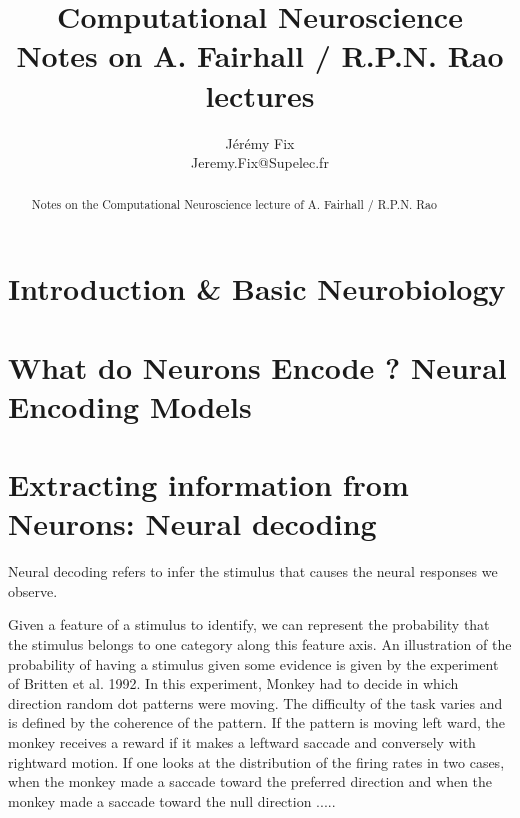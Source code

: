 \documentclass[10pt,a4paper]{article}
\title{Computational Neuroscience \\ 
		\large \vspace*{-10pt} Notes on A. Fairhall / R.P.N. Rao lectures\vspace*{10pt}}
\author{%
	Jérémy Fix \\
	Jeremy.Fix@Supelec.fr \\
	\vspace{20pt}
	}
\makeatletter
\def\printtitle{%
    {\color{bl} \centering \huge \sc \textbf{\@title}\par}}		%
\def\printauthor{%
    {\centering \small \@author}}				%
\makeatother
\begin{document}
\printtitle 

\printauthor

\begin{abstract}
Notes on the Computational Neuroscience lecture of A. Fairhall / R.P.N. Rao
\end{abstract}

\tableofcontents

\pagebreak

\section{Introduction \& Basic Neurobiology}

\section{What do Neurons Encode ? Neural Encoding Models}

\section{Extracting information from Neurons: Neural decoding}

Neural decoding refers to infer the stimulus that causes the neural
responses we observe.

Given a feature of a stimulus to identify, we can represent the
probability that the stimulus belongs to one category along this
feature axis. An illustration of the probability of having a stimulus
given some evidence is given by the experiment of Britten et
al. 1992. In this experiment, Monkey had to decide in which direction
random dot patterns were moving. The difficulty of the task varies and
is defined by the coherence of the pattern. If the pattern is moving
left ward, the monkey receives a reward if it makes a leftward saccade
and conversely with rightward motion. If one looks at the distribution
of the firing rates in two cases, when the monkey made a saccade
toward the preferred direction and when the monkey made a saccade
toward the null direction .....
\end{document}
